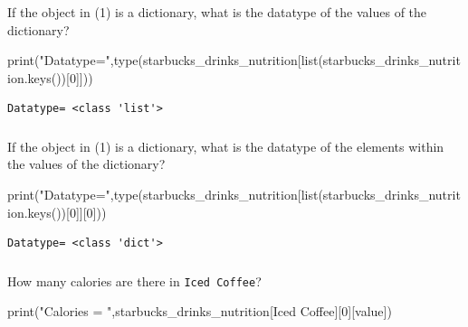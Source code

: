 \documentclass[
  letterpaper,
  DIV=11,
  numbers=noendperiod]{scrreprt}
\newenvironment{Shaded}{\begin{snugshade}}{\end{snugshade}}
\newcommand{\BuiltInTok}[1]{\textcolor[rgb]{0.00,0.23,0.31}{#1}}
\newcommand{\DecValTok}[1]{\textcolor[rgb]{0.68,0.00,0.00}{#1}}
\newcommand{\NormalTok}[1]{\textcolor[rgb]{0.00,0.23,0.31}{#1}}
\newcommand{\StringTok}[1]{\textcolor[rgb]{0.13,0.47,0.30}{#1}}
\begin{document}
If the object in (1) is a dictionary, what is the datatype of the values
of the dictionary?

\begin{Shaded}
\begin{Highlighting}[]
\BuiltInTok{print}\NormalTok{(}\StringTok{"Datatype="}\NormalTok{,}\BuiltInTok{type}\NormalTok{(starbucks\_drinks\_nutrition[}\BuiltInTok{list}\NormalTok{(starbucks\_drinks\_nutrition.keys())[}\DecValTok{0}\NormalTok{]]))}
\end{Highlighting}
\end{Shaded}

\begin{verbatim}
Datatype= <class 'list'>
\end{verbatim}

\hypertarget{section-15}{%
\subsubsection{}\label{section-15}}

If the object in (1) is a dictionary, what is the datatype of the
elements within the values of the dictionary?

\begin{Shaded}
\begin{Highlighting}[]
\BuiltInTok{print}\NormalTok{(}\StringTok{"Datatype="}\NormalTok{,}\BuiltInTok{type}\NormalTok{(starbucks\_drinks\_nutrition[}\BuiltInTok{list}\NormalTok{(starbucks\_drinks\_nutrition.keys())[}\DecValTok{0}\NormalTok{]][}\DecValTok{0}\NormalTok{]))}
\end{Highlighting}
\end{Shaded}

\begin{verbatim}
Datatype= <class 'dict'>
\end{verbatim}

\hypertarget{section-16}{%
\subsubsection{}\label{section-16}}

How many calories are there in \texttt{Iced\ Coffee}?

\begin{Shaded}
\begin{Highlighting}[]
\BuiltInTok{print}\NormalTok{(}\StringTok{"Calories = "}\NormalTok{,starbucks\_drinks\_nutrition[}\StringTok{\textquotesingle{}Iced Coffee\textquotesingle{}}\NormalTok{][}\DecValTok{0}\NormalTok{][}\StringTok{\textquotesingle{}value\textquotesingle{}}\NormalTok{])}
\end{Highlighting}
\end{Shaded}
\end{document}
